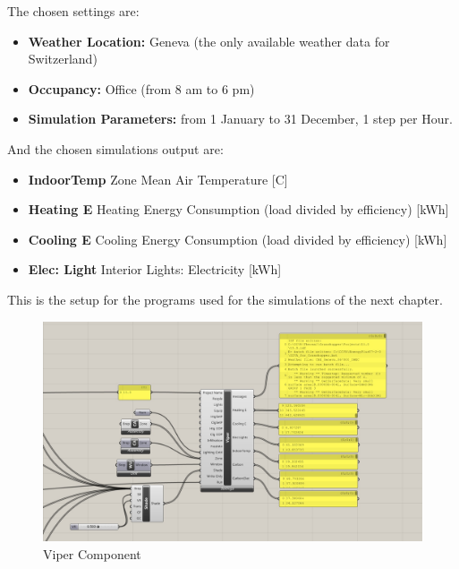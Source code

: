 The chosen settings are:
\begin{itemize}
\item \textbf{Weather Location:} Geneva (the only available weather data for Switzerland)
\item \textbf{Occupancy:} Office (from 8 am to 6 pm)
\item \textbf{Simulation Parameters:} from 1 January to 31 December, 1 step per Hour.
\end{itemize}
And the chosen simulations output are:
\begin{itemize}
\item \textbf{IndoorTemp} Zone Mean Air Temperature [C]
\item \textbf{Heating E} Heating Energy Consumption (load divided by efficiency) [kWh]
\item \textbf{Cooling E} Cooling Energy Consumption (load divided by efficiency) [kWh]
\item \textbf{Elec: Light} Interior Lights: Electricity [kWh]
\end{itemize}

This is the setup for the programs used for the simulations of the next chapter.

\begin{figure}[h]
 \centering
 \includegraphics[width=140mm]{graphic/GH_diva.jpg}
 \caption{Viper Component}
 \label{GH_diva}
\end{figure}

